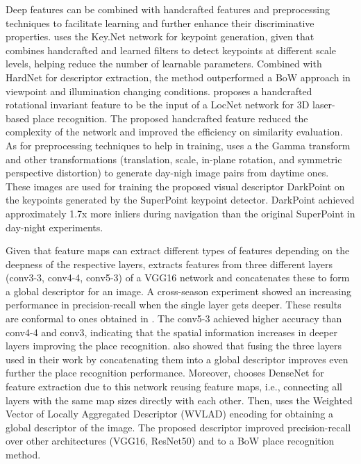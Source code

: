 Deep features can be combined with handcrafted features and preprocessing techniques to facilitate learning and further enhance their discriminative properties.
\cite{zhang-et-al:2022:3086822} uses the Key.Net network for keypoint generation, given that combines handcrafted and learned filters to detect keypoints at different scale levels, helping reduce the number of learnable parameters. Combined with HardNet for descriptor extraction, the method outperformed a BoW approach in viewpoint and illumination changing conditions.
\cite{yin-et-al:2020:2905046} proposes a handcrafted rotational invariant feature to be the input of a LocNet network for 3D laser-based place recognition. The proposed handcrafted feature reduced the complexity of the network and improved the efficiency on similarity evaluation.
As for preprocessing techniques to help in training, \cite{sun-et-al:2021:9635886} uses a the Gamma transform and other transformations (translation, scale, in-plane rotation, and symmetric perspective distortion) to generate day-nigh image pairs from daytime ones. These images are used for training the proposed visual descriptor DarkPoint on the keypoints generated by the SuperPoint keypoint detector. DarkPoint achieved approximately 1.7x more inliers during navigation than the original SuperPoint in day-night experiments.

Given that feature maps can extract different types of features depending on the deepness of the respective layers, \cite{zhu-et-al:2018:8500686} extracts features from three different layers (conv3-3, conv4-4, conv5-3) of a VGG16 network and concatenates these to form a global descriptor for an image. A cross-season experiment showed an increasing performance in precision-recall when the single layer gets deeper.
These results are conformal to ones obtained in \cite{yang-et-al:2021:12054}. The conv5-3 achieved higher accuracy than conv4-4 and conv3, indicating that the spatial information increases in deeper layers improving the place recognition. \cite{zhu-et-al:2018:8500686} also showed that fusing the three layers used in their work by concatenating them into a global descriptor improves even further the place recognition performance.
Moreover, \cite{yu-et-al:2019:8961714} chooses DenseNet for feature extraction due to this network reusing feature maps, i.e., connecting all layers with the same map sizes directly with each other. Then, \cite{yu-et-al:2019:8961714} uses the Weighted Vector of Locally Aggregated Descriptor (WVLAD) encoding for obtaining a global descriptor of the image. The proposed descriptor improved precision-recall over other architectures (VGG16, ResNet50) and to a BoW place recognition method.

